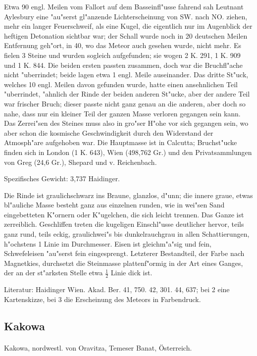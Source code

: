 \documentclass[a4paper, 11pt, oneside]{article}
\begin{document}
Etwa 90 engl. Meilen vom Fallort auf dem Basseinfl"usse fahrend sah Leutnant Aylesbury eine "au"serst gl"anzende Lichterscheinung von SW. nach NO. ziehen, mehr ein langer Feuerschweif, als eine Kugel, die eigentlich nur im Augenblick der heftigen Detonation sichtbar war; der Schall wurde noch in 20 deutschen Meilen Entfernung geh"ort, in 40, wo das Meteor auch gesehen wurde, nicht mehr. Es fielen 3 Steine und wurden sogleich aufgefunden; sie wogen 2 K. 291, 1 K. 909 und 1 K. 844. Die beiden ersten passten zusammen, doch war die Bruchfl"ache nicht "uberrindet; beide lagen etwa 1 engl. Meile auseinander. Das dritte St"uck, welches 10 engl. Meilen davon gefunden wurde, hatte einen ansehnlichen Teil "uberrindet, "ahnlich der Rinde der beiden anderen St"ucke, aber der andere Teil war frischer Bruch; dieser passte nicht ganz genau an die anderen, aber doch so nahe, dass nur ein kleiner Teil der ganzen Masse verloren gegangen sein kann. Das Zerrei"sen des Steines muss also in gro"ser H"ohe vor sich gegangen sein, wo aber schon die kosmische Geschwindigkeit durch den Widerstand der Atmosph"are aufgehoben war. Die Hauptmasse ist in Calcutta; Bruchst"ucke finden sich in London (1 K. 643), Wien (498,762 Gr.) und den Privatsammlungen von Greg (24,6 Gr.), Shepard und v. Reichenbach.

Spezifisches Gewicht: 3,737 Haidinger.

Die Rinde ist graulichschwarz ins Braune, glanzlos, d"unn; die innere graue, etwas bl"auliche Masse besteht ganz aus einzelnen runden, wie in wei"sen Sand eingebetteten K"ornern oder K"ugelchen, die sich leicht trennen. Das Ganze ist zerreiblich. Geschliffen treten die kugeligen Einschl"usse deutlicher hervor, teils ganz rund, teils eckig, graulichwei"s bis dunkelrauchgrau in allen Schattierungen, h"ochstens 1 Linie im Durchmesser. Eisen ist gleichm"a"sig und fein, Schwefeleisen "au"serst fein eingesprengt. Letzterer Bestandteil, der Farbe nach Magnetkies, durchsetzt die Steinmasse plattenf"ormig in der Art eines Ganges, der an der st"arksten Stelle etwa $\frac{1}{2}$ Linie dick ist.

Literatur: Haidinger Wien. Akad. Ber. 41, 750. 42, 301. 44, 637; bei 2 eine Kartenskizze, bei 3 die Erscheinung des Meteors in Farbendruck.

\subsection{Kakowa}
\normalsize
\paragraph{}
Kakowa, nordwestl. von Oravitza, Temeser Banat, Österreich.
\end{document}
